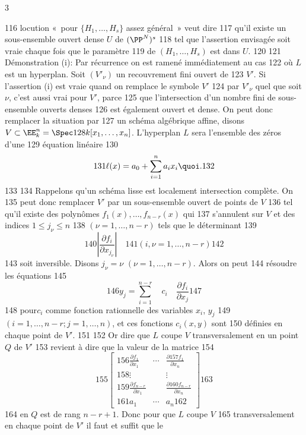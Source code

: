 3	\documentclass[10pt]{../fichiers-configuration-latex/smfart}
\begin{document}
   116	locution « pour $\{H_1,\ldots,H_s\}$ assez général » veut dire
   117	qu'il existe un sous-ensemble ouvert dense $U$ de $(\PP^N)^s$
   118	tel que l'assertion envisagée soit vraie chaque fois que le paramètre
   119	de $(H_1,\ldots,H_s)$ est dans $U$.
   120	
   121	Démonstration (i): Par récurrence on est ramené immédiatement au cas
   122	où $L$ est un hyperplan. Soit $(V'_{\nu})$ un recouvrement fini ouvert de
   123	$V'$. Si l'assertion (i) est vraie quand on remplace le symbole $V'$
   124	par $V'_{\nu}$ quel que soit $\nu$, c'est aussi vrai pour $V'$, parce
   125	que l'intersection d'un nombre fini de sous-ensemble ouverts denses
   126	est également ouvert et dense. On peut donc remplacer la situation par
   127	un schéma algébrique affine, disons $V\subset \EE^n_k=\Spec
   128	k[x_1,\ldots,x_n]$. L'hyperplan $L$ sera l'ensemble des zéros d'une
   129	équation linéaire
   130	$$
   131	\ell(x)=a_0+\sum^n_{i=1}a_ix_i{\quoi}.
   132	$$
   133	
   134	Rappelons qu'un schéma lisse est localement intersection complète. On
   135	peut donc remplacer $V'$ par un sous-ensemble ouvert de points de $V$
   136	tel qu'il existe des polynômes $f_1(x),\ldots,f_{n-r}(x)$ qui
   137	s'annulent sur $V$ et des indices $1\leq j_{\nu}\leq n$
   138	$(\nu=1,\ldots,n-r)$ tels que le déterminant
   139	$$
   140	\left|\frac{\partial f_i}{\partial x_{j_{\nu}}}\right|\quad 
   141	(i,\nu=1,\ldots,n-r)
   142	$$
   143	soit inversible. Disons $j_{\nu}=\nu$ $(\nu=1,\ldots,n-r)$. Alors on peut
   144	résoudre les équations
   145	$$
   146	y_j=\sum^{n-r}_{i=1}\quad c_i\quad \frac{\partial f_i}{\partial x_j}
   147	$$
   148	pour\pageoriginale $c_i$ comme fonction rationnelle des variables $x_i$, $y_j$
   149	$(i=1,\ldots, n-r; j=1,\ldots,n)$, et ces fonctions $c_i(x,y)$ sont
   150	définies en chaque point de $V'$.
   151	
   152	Or dire que $L$ coupe $V$ transversalement en un point $Q$ de $V'$
   153	revient à dire que la valeur de la matrice
   154	$$
   155	\begin{bmatrix}
   156	\frac{\partial f_1}{\partial x_1} & \cdots & \frac{\partial
   157	  f_1}{\partial x_n}\\
   158	\vdots & &\vdots\\
   159	\frac{\partial f_{n-r}}{\partial x_1} & & \frac{\partial
   160	  f_{n-r}}{\partial x_n}\\
   161	a_1 & \cdots & a_n
   162	\end{bmatrix}
   163	$$
   164	en $Q$ est de rang $n-r+1$. Donc pour que $L$ coupe $V$
   165	transversalement en chaque point de $V'$ il faut et suffit que le
\end{document}

